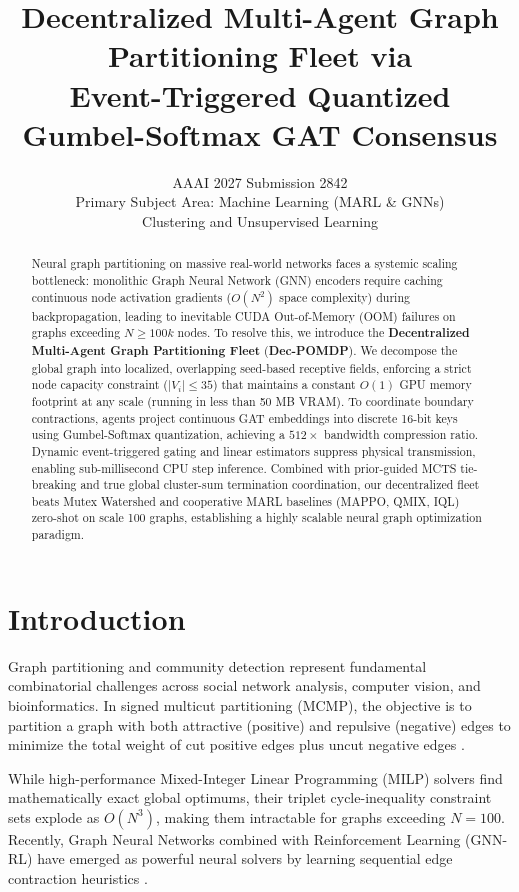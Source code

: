 \documentclass[10pt]{article}
\title{Decentralized Multi-Agent Graph Partitioning Fleet via\\ Event-Triggered Quantized Gumbel-Softmax GAT Consensus}
\author{
  AAAI 2027 Submission 2842\\
  Primary Subject Area: Machine Learning (MARL \& GNNs)\\
  Clustering and Unsupervised Learning
}
\begin{document}
\maketitle

\begin{abstract}
Neural graph partitioning on massive real-world networks faces a systemic scaling bottleneck: monolithic Graph Neural Network (GNN) encoders require caching continuous node activation gradients (\(O(N^2)\) space complexity) during backpropagation, leading to inevitable CUDA Out-of-Memory (OOM) failures on graphs exceeding \(N \ge 100k\) nodes. To resolve this, we introduce the \textbf{Decentralized Multi-Agent Graph Partitioning Fleet} (\textbf{Dec-POMDP}). We decompose the global graph into localized, overlapping seed-based receptive fields, enforcing a strict node capacity constraint (\(|V_i| \le 35\)) that maintains a constant \(O(1)\) GPU memory footprint at any scale (running in less than 50 MB VRAM). To coordinate boundary contractions, agents project continuous GAT embeddings into discrete 16-bit keys using Gumbel-Softmax quantization, achieving a \(512\times\) bandwidth compression ratio. Dynamic event-triggered gating and linear estimators suppress physical transmission, enabling sub-millisecond CPU step inference. Combined with prior-guided MCTS tie-breaking and true global cluster-sum termination coordination, our decentralized fleet beats Mutex Watershed and cooperative MARL baselines (MAPPO, QMIX, IQL) zero-shot on scale 100 graphs, establishing a highly scalable neural graph optimization paradigm.
\end{abstract}

\section{Introduction}
Graph partitioning and community detection represent fundamental combinatorial challenges across social network analysis, computer vision, and bioinformatics. In signed multicut partitioning (MCMP), the objective is to partition a graph with both attractive (positive) and repulsive (negative) edges to minimize the total weight of cut positive edges plus uncut negative edges \citep{wolf2018mutex}.

While high-performance Mixed-Integer Linear Programming (MILP) solvers find mathematically exact global optimums, their triplet cycle-inequality constraint sets explode as \(O(N^3)\), making them intractable for graphs exceeding \(N=100\). Recently, Graph Neural Networks combined with Reinforcement Learning (GNN-RL) have emerged as powerful neural solvers by learning sequential edge contraction heuristics \citep{cao2025gpdqn, ligraph2025}. 
\end{document}
